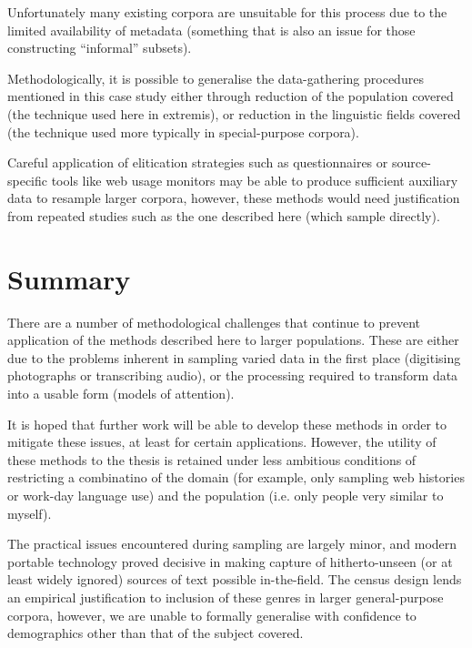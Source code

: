 Unfortunately many existing corpora are unsuitable for this process due to the limited availability of metadata (something that is also an issue for those constructing ``informal'' subsets).

Methodologically, it is possible to generalise the data-gathering procedures mentioned in this case study either through reduction of the population covered (the technique used here in extremis), or reduction in the linguistic fields covered (the technique used more typically in special-purpose corpora).

Careful application of elitication strategies such as questionnaires or source-specific tools like web usage monitors may be able to produce sufficient auxiliary data to resample larger corpora, however, these methods would need justification from repeated studies such as the one described here (which sample directly).




\section{Summary}
There are a number of methodological challenges that continue to prevent application of the methods described here to larger populations.  These are either due to the problems inherent in sampling varied data in the first place (digitising photographs or transcribing audio), or the processing required to transform data into a usable form (models of attention).

It is hoped that further work will be able to develop these methods in order to mitigate these issues, at least for certain applications.  However, the utility of these methods to the thesis is retained under less ambitious conditions of restricting a combinatino of the domain (for example, only sampling web histories or work-day language use) and the population (i.e. only people very similar to myself).

The practical issues encountered during sampling are largely minor, and modern portable technology proved decisive in making capture of hitherto-unseen (or at least widely ignored) sources of text possible in-the-field.  The census design lends an empirical justification to inclusion of these genres in larger general-purpose corpora, however, we are unable to formally generalise with confidence to demographics other than that of the subject covered.

